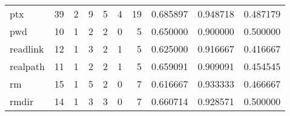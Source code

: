 \begin{longtable}{lrrrrrrrrr}
ptx       &                                      39 &                                                  2 &                                                  9 &                                                  5 &                                                  4 &                                                 19 &                                           0.685897 &                               0.948718 &                             0.487179 \\
pwd       &                                      10 &                                                  1 &                                                  2 &                                                  2 &                                                  0 &                                                  5 &                                           0.650000 &                               0.900000 &                             0.500000 \\
readlink  &                                      12 &                                                  1 &                                                  3 &                                                  2 &                                                  1 &                                                  5 &                                           0.625000 &                               0.916667 &                             0.416667 \\
realpath  &                                      11 &                                                  1 &                                                  2 &                                                  2 &                                                  1 &                                                  5 &                                           0.659091 &                               0.909091 &                             0.454545 \\
rm        &                                      15 &                                                  1 &                                                  5 &                                                  2 &                                                  0 &                                                  7 &                                           0.616667 &                               0.933333 &                             0.466667 \\
rmdir     &                                      14 &                                                  1 &                                                  3 &                                                  3 &                                                  0 &                                                  7 &                                           0.660714 &                               0.928571 &                             0.500000 \\

\end{longtable}
